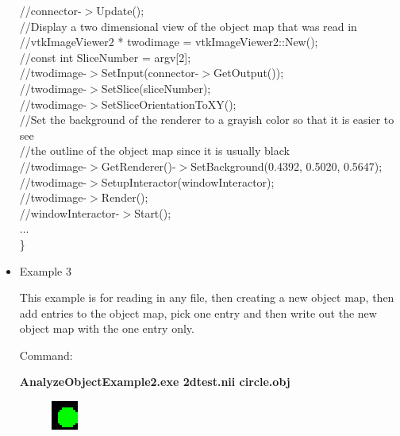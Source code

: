 \documentclass{InsightArticle}
\begin{document}
\begin{itemize}
{		//connector-$>$Update();\\
		
		//Display a two dimensional view of the object map that was read in\\
		//vtkImageViewer2 * twodimage = vtkImageViewer2::New();\\
		
		//const int SliceNumber = argv[2];\\
		//twodimage-$>$SetInput(connector-$>$GetOutput());\\
		//twodimage-$>$SetSlice(sliceNumber);\\
		//twodimage-$>$SetSliceOrientationToXY();\\
		
		//Set the background of the renderer to a grayish color so that it is easier to see\\
		//the outline of the object map since it is usually black\\
		//twodimage-$>$GetRenderer()-$>$SetBackground(0.4392, 0.5020, 0.5647);\\
		
		
		//twodimage-$>$SetupInteractor(windowInteractor);\\
		
		//twodimage-$>$Render();\\
		//windowInteractor-$>$Start();\\
		...\\
\}
}
                                                                               
\item Example 3

This example is for reading in any file, then creating a new object map, then add entries to the object map, pick one entry and then write out the new object map with the one entry only.

Command:

\textbf{AnalyzeObjectExample2.exe 2dtest.nii circle.obj}

\begin{figure}[h]
\center
\includegraphics[width=.14\textwidth]{circle.eps}
\label{fig:StreamingConceptDiagram}
\end{figure}


\end{itemize}
\end{document}
